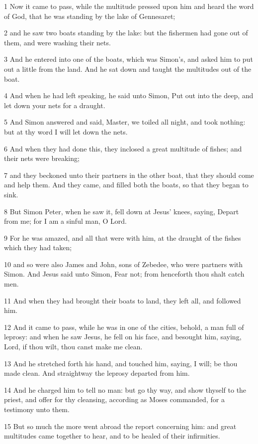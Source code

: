 \par 1 Now it came to pass, while the multitude pressed upon him and heard the word of God, that he was standing by the lake of Gennesaret;
\par 2 and he saw two boats standing by the lake: but the fishermen had gone out of them, and were washing their nets.
\par 3 And he entered into one of the boats, which was Simon's, and asked him to put out a little from the land. And he sat down and taught the multitudes out of the boat.
\par 4 And when he had left speaking, he said unto Simon, Put out into the deep, and let down your nets for a draught.
\par 5 And Simon answered and said, Master, we toiled all night, and took nothing: but at thy word I will let down the nets.
\par 6 And when they had done this, they inclosed a great multitude of fishes; and their nets were breaking;
\par 7 and they beckoned unto their partners in the other boat, that they should come and help them. And they came, and filled both the boats, so that they began to sink.
\par 8 But Simon Peter, when he saw it, fell down at Jesus' knees, saying, Depart from me; for I am a sinful man, O Lord.
\par 9 For he was amazed, and all that were with him, at the draught of the fishes which they had taken;
\par 10 and so were also James and John, sons of Zebedee, who were partners with Simon. And Jesus said unto Simon, Fear not; from henceforth thou shalt catch men.
\par 11 And when they had brought their boats to land, they left all, and followed him.
\par 12 And it came to pass, while he was in one of the cities, behold, a man full of leprosy: and when he saw Jesus, he fell on his face, and besought him, saying, Lord, if thou wilt, thou canst make me clean.
\par 13 And he stretched forth his hand, and touched him, saying, I will; be thou made clean. And straightway the leprosy departed from him.
\par 14 And he charged him to tell no man: but go thy way, and show thyself to the priest, and offer for thy cleansing, according as Moses commanded, for a testimony unto them.
\par 15 But so much the more went abroad the report concerning him: and great multitudes came together to hear, and to be healed of their infirmities.
